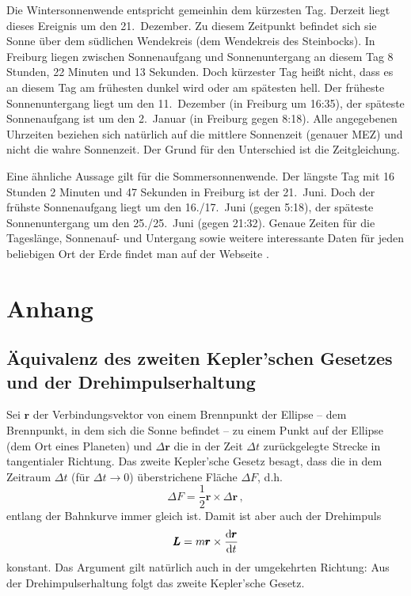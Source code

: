 Die Wintersonnenwende entspricht gemeinhin dem k\"urzesten Tag. Derzeit liegt dieses Ereignis
um den 21.\ Dezember. 
Zu diesem Zeitpunkt befindet sich sie Sonne \"uber dem s\"udlichen
Wendekreis (dem Wendekreis des Steinbocks). 
In Freiburg liegen zwischen Sonnenaufgang
und Sonnenuntergang an diesem Tag 8 Stunden, 22 Minuten und 13 Sekunden. Doch k\"urzester 
Tag hei\ss t nicht, dass es an diesem Tag am fr\"uhesten dunkel wird oder am sp\"atesten
hell. Der fr\"uheste Sonnenuntergang liegt um den 11.\ Dezember (in Freiburg um 16:35),
der sp\"ateste Sonnenaufgang ist um den 2.\ Januar (in Freiburg gegen 8:18). Alle angegebenen
Uhrzeiten beziehen sich nat\"urlich auf die mittlere Sonnenzeit (genauer MEZ) und nicht die
wahre Sonnenzeit. Der Grund f\"ur den Unterschied ist die Zeitgleichung. 

Eine \"ahnliche Aussage gilt f\"ur die Sommersonnenwende. 
Der l\"angste Tag mit
16 Stunden 2 Minuten und 47 Sekunden in Freiburg ist der 21.\ Juni. Doch der fr\"uhste Sonnenaufgang
liegt um den 16./17.\ Juni (gegen 5:18), der sp\"ateste Sonnenuntergang um den 25./25.\ Juni (gegen
21:32). Genaue Zeiten f\"ur die Tagesl\"ange, Sonnenauf- und Untergang sowie weitere
interessante Daten f\"ur jeden beliebigen Ort der Erde findet man auf der Webseite \cite{timeanddate}.

\section{Anhang}
\subsection{\"Aquivalenz des zweiten Kepler'schen Gesetzes und der Drehimpulserhaltung}
\label{sec_Zeitgleichung_A}

Sei $\pmb{r}$ der Verbindungsvektor von einem Brennpunkt der Ellipse -- dem Brennpunkt, in 
dem sich die Sonne befindet -- zu einem Punkt auf der Ellipse (dem Ort eines Planeten)
und $\Delta \pmb{r}$ die in der Zeit $\Delta t$ zur\"uckgelegte Strecke in tangentialer
Richtung. Das zweite Kepler'sche Gesetz 
besagt, dass die in dem Zeitraum $\Delta t$ (f\"ur $\Delta t\rightarrow 0$)
\"uberstrichene Fl\"ache $\Delta F$, d.h.
\begin{equation}
                    \Delta F = \frac{1}{2} \pmb{r} \times \Delta \pmb{r} \, ,
\end{equation} 
entlang der Bahnkurve immer gleich ist. Damit ist aber auch der Drehimpuls
\begin{equation}
                    \pmb{L} = m  \pmb{r} \times \frac{{\rm d} \pmb{r}}{{\rm d} t} 
\end{equation} 
konstant.
Das Argument gilt nat\"urlich auch in der umgekehrten Richtung: Aus der
Drehimpulserhaltung folgt das zweite Kepler'sche Gesetz.



